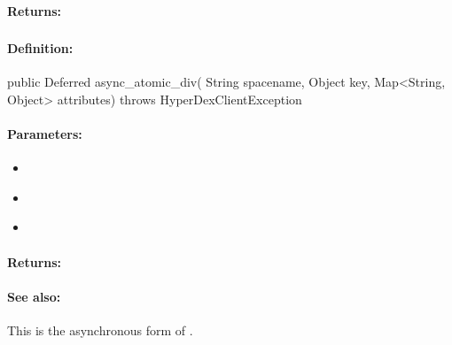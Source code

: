 \paragraph{Returns:}


\pagebreak
\subsubsection{}
\label{api:java:async_atomic_div}


\paragraph{Definition:}
\begin{javacode}
public Deferred async_atomic_div(
        String spacename,
        Object key,
        Map<String, Object> attributes) throws HyperDexClientException
\end{javacode}

\paragraph{Parameters:}
\begin{itemize}[noitemsep]
\item {}\\

\item {}\\

\item {}\\

\end{itemize}

\paragraph{Returns:}


\paragraph{See also:}  This is the asynchronous form of .

\pagebreak
